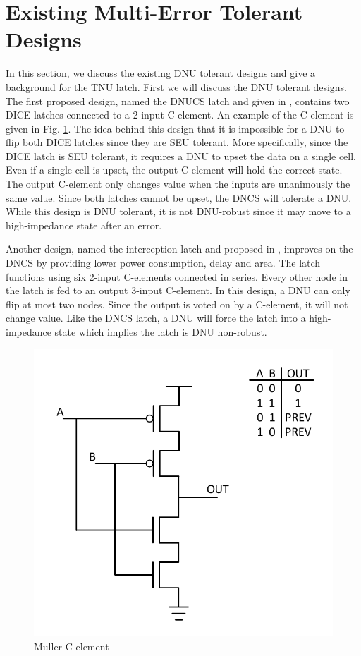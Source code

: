 \section{Existing Multi-Error Tolerant Designs} \label{sec:DNUdes}

In this section, we discuss the existing DNU tolerant designs and give a background for the TNU latch. First we will discuss the DNU tolerant designs. The first proposed design, named the DNUCS latch and given in \cite{DNCS}, contains two DICE latches connected to a 2-input C-element. An example of the C-element is given in Fig. \ref{Cele_fig}. The idea behind this design that it is impossible for a DNU to flip both DICE latches since they are SEU tolerant. More specifically, since the DICE latch is SEU tolerant, it requires a DNU to upset the data on a single cell. Even if a single cell is upset, the output C-element will hold the correct state. The output C-element only changes value when the inputs are unanimously the same value. Since both latches cannot be upset, the DNCS will tolerate a DNU. While this design is DNU tolerant, it is not DNU-robust since it may move to a high-impedance state after an error. 

Another design, named the interception latch and proposed in \cite{Inter}, improves on the DNCS by providing lower power consumption, delay and area. The latch functions using six 2-input C-elements connected in series. Every other node in the latch is fed to an output 3-input C-element. In this design, a DNU can only flip at most two nodes. Since the output is voted on by a C-element, it will not change value. Like the DNCS latch, a DNU will force the latch into a high-impedance state which implies the latch is DNU non-robust.

\begin{figure}[!htbp]
	\centering
	\includegraphics[width=0.75\linewidth]{Figures/C_ele}
	\caption{Muller C-element}
	\label{Cele_fig}
\end{figure}

